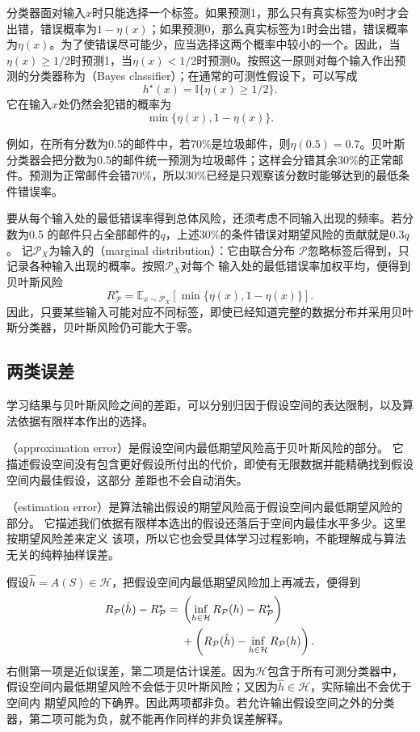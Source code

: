 分类器面对输入$x$时只能选择一个标签。如果预测1，那么只有真实标签为0时才会出错，错误概率为$1-\eta(x)$；如果预测0，那么真实标签为1时会出错，错误概率为$\eta(x)$。为了使错误尽可能少，应当选择这两个概率中较小的一个。因此，当$\eta(x)\geq1/2$时预测1，当$\eta(x)<1/2$时预测0。按照这一原则对每个输入作出预测的分类器称为（Bayes classifier）；在通常的可测性假设下，可以写成
\[
 h^\star(x)=\mathbb I\{\eta(x)\geq1/2\}.
\]
它在输入$x$处仍然会犯错的概率为
\[
 \min\{\eta(x),1-\eta(x)\}.
\]

例如，在所有分数为0.5的邮件中，若70\%是垃圾邮件，则$\eta(0.5)=0.7$。贝叶斯分类器会把分数为0.5的邮件统一预测为垃圾邮件；这样会分错其余30\%的正常邮件。预测为正常邮件会错70\%，所以30\%已经是只观察该分数时能够达到的最低条件错误率。

要从每个输入处的最低错误率得到总体风险，还须考虑不同输入出现的频率。若分数为0.5
的邮件只占全部邮件的$q$，上述30\%的条件错误对期望风险的贡献就是$0.3q$。
记$\mathcal P_X$为输入的（marginal distribution）：它由联合分布
$\mathcal P$忽略标签后得到，只记录各种输入出现的概率。按照$\mathcal P_X$对每个
输入处的最低错误率加权平均，便得到贝叶斯风险
\[
 R_{\mathcal P}^\star=
 \mathbb E_{x\sim\mathcal P_X}[\min\{\eta(x),1-\eta(x)\}].
\]
因此，只要某些输入可能对应不同标签，即使已经知道完整的数据分布并采用贝叶斯分类器，贝叶斯风险仍可能大于零。

\subsection{两类误差}

学习结果与贝叶斯风险之间的差距，可以分别归因于假设空间的表达限制，以及算法依据有限样本作出的选择。

（approximation error）是假设空间内最低期望风险高于贝叶斯风险的部分。
它描述假设空间没有包含更好假设所付出的代价，即使有无限数据并能精确找到假设空间内最佳假设，这部分
差距也不会自动消失。

（estimation error）是算法输出假设的期望风险高于假设空间内最低期望风险的部分。
它描述我们依据有限样本选出的假设还落后于空间内最佳水平多少。这里按期望风险差来定义
该项，所以它也会受具体学习过程影响，不能理解成与算法无关的纯粹抽样误差。

假设$\hat h=A(S)\in\mathcal H$，把假设空间内最低期望风险加上再减去，便得到
\begin{align}
 R_{\mathcal P}(\hat h)-R_{\mathcal P}^\star
 ={}&\left(\inf_{h\in\mathcal H}R_{\mathcal P}(h)-R_{\mathcal P}^\star\right)
 \label{eq:approximation-estimation-decomposition}\\
 &+\left(R_{\mathcal P}(\hat h)-\inf_{h\in\mathcal H}R_{\mathcal P}(h)\right).
 \notag
\end{align}
右侧第一项是近似误差，第二项是估计误差。因为$\mathcal H$包含于所有可测分类器中，
假设空间内最低期望风险不会低于贝叶斯风险；又因为$\hat h\in\mathcal H$，实际输出不会优于空间内
期望风险的下确界。因此两项都非负。若允许输出假设空间之外的分类器，第二项可能为负，就不能再作同样的非负误差解释。

